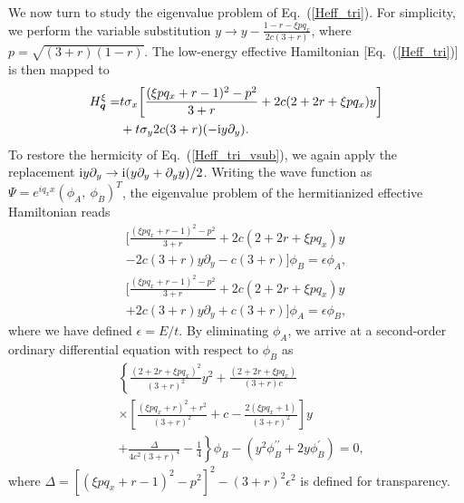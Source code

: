 \documentclass[aps, twocolumn, floatfix, superscriptaddress, prb]{revtex4-1}
\begin{document}
We now turn to study the eigenvalue problem of Eq.~(\ref{Heff_tri}). For simplicity, we perform the variable substitution $y\rightarrow y-\frac{1-r-\xi pq_x}{2c(3+r)}$, where $p=\sqrt{(3+r)(1-r)}$. The low-energy effective Hamiltonian [Eq.~(\ref{Heff_tri})] is then mapped to
%
{
\begin{align} \label{Heff_tri_vsub}
H_{\bm q}^\xi=&t\sigma_x\bigg[\frac{(\xi pq_x+r-1)^2-p^2}{3+r} +2c(2+2r+\xi pq_x)y\bigg] \nonumber
\\
&+t\sigma_y2c(3+r)(-{\rm i}y\partial_y).
\end{align}
}
%
To restore the hermicity of Eq.~(\ref{Heff_tri_vsub}), we again apply the replacement ${\rm i}y\partial_y\rightarrow {\rm i}(y\partial_y+\partial_yy)/2$. Writing the wave function as $\Psi=e^{iq_xx}(\phi_A,\ \phi_B)^T$, the eigenvalue problem of the hermitianized effective Hamiltonian reads
%
{
\begin{equation}
\begin{split}
\bigg[\frac{(\xi pq_x+r-1)^2-p^2}{3+r} +2c(2+2r+\xi pq_x)y
\\
-2c(3+r)y\partial_y-c(3+r)\bigg]\phi_B=\epsilon\phi_A,
\\
\bigg[\frac{(\xi pq_x+r-1)^2-p^2}{3+r} +2c(2+2r+\xi pq_x)y
\\
+2c(3+r)y\partial_y+c(3+r)\bigg]\phi_A=\epsilon\phi_B,
\end{split}
\end{equation}
}
%
where we have defined $\epsilon=E/t$. By eliminating $\phi_A$, we arrive at a second-order ordinary differential equation with respect to $\phi_B$ as
%
\begin{equation} \label{ode_tri}
\begin{split}
&\left\{\frac{(2+2r+\xi pq_x)^2}{(3+r)^2}y^2+\frac{(2+2r+\xi pq_x)}{(3+r)c}\right.
\\
&\times \left[\frac{(\xi pq_x+r)^2+r^2}{(3+r)^2}+c-\frac{2(\xi pq_x+1)}{(3+r)^2}\right]y
\\
&\left.+\frac{\Delta}{4c^2(3+r)^4}-\frac{1}{4}\right\}\phi_B-(y^2\phi_B^{\prime\prime}+2y\phi_B^\prime)=0,
\end{split}
\end{equation}
%
where {$\Delta={\left[(\xi pq_x+r-1)^2-p^2\right]^2-(3+r)^2\epsilon^2}$} is defined for transparency.
\end{document}

